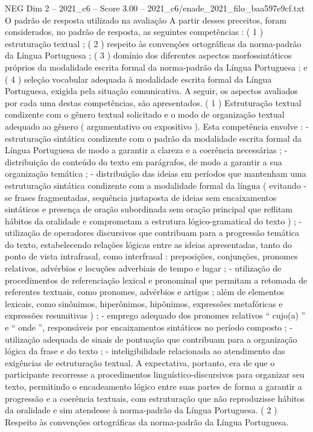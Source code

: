 \begin{textsample}{NEG Dim 2 – 2021\_c6 – Score 3.00 – 2021\_c6/enade\_2021\_filo\_baa597e9cf.txt}
O padrão de resposta utilizado na avaliação A partir desses preceitos, foram considerados, no padrão de resposta, as seguintes competências : ( 1 ) estruturação textual ; ( 2 ) respeito às convenções ortográficas da norma-padrão da Língua Portuguesa ; ( 3 ) domínio dos diferentes aspectos morfossintáticos próprios da modalidade escrita formal da norma-padrão da Língua Portuguesa ; e ( 4 ) seleção vocabular adequada à modalidade escrita formal da Língua Portuguesa, exigida pela situação comunicativa.
A seguir, os aspectos avaliados por cada uma destas competências, são apresentados. ( 1 ) Estruturação textual condizente com o gênero textual solicitado e o modo de organização textual adequado ao gênero ( argumentativo ou expositivo ).
Esta competência envolve : - estruturação sintática condizente com o padrão da modalidade escrita formal da Língua Portuguesa de modo a garantir a clareza e a coerência necessárias ; - distribuição do conteúdo do texto em parágrafos, de modo a garantir a sua organização temática ; - distribuição das ideias em períodos que mantenham uma estruturação sintática condizente com a modalidade formal da língua ( evitando -se frases fragmentadas, sequência justaposta de ideias sem encaixamentos sintáticos e presença de oração subordinada sem oração principal que reflitam hábitos da oralidade e comprometam a estrutura lógico-gramatical do texto ) ; - utilização de operadores discursivos que contribuam para a progressão temática do texto, estabelecendo relações lógicas entre as ideias apresentadas, tanto do ponto de vista intrafrasal, como interfrasal : preposições, conjunções, pronomes relativos, advérbios e locuções adverbiais de tempo e lugar ; - utilização de procedimentos de referenciação lexical e pronominal que permitam a retomada de referentes textuais, como pronomes, advérbios e artigos ; além de elementos lexicais, como sinônimos, hiperônimos, hipônimos, expressões metafóricas e expressões resumitivas ) ; - emprego adequado dos pronomes relativos “ cujo(a) ” e “ onde ”, responsáveis por encaixamentos sintáticos no período composto ; - utilização adequada de sinais de pontuação que contribuam para a organização lógica da frase e do texto ; - inteligibilidade relacionada ao atendimento das exigências de estruturação textual.
A expectativa, portanto, era de que o participante recorresse a procedimentos linguístico-discursivos para organizar seu texto, permitindo o encadeamento lógico entre suas partes de forma a garantir a progressão e a coerência textuais, com estruturação que não reproduzisse hábitos da oralidade e sim atendesse à norma-padrão da Língua Portuguesa. ( 2 ) Respeito às convenções ortográficas da norma-padrão da Língua Portuguesa.

\end{textsample}
